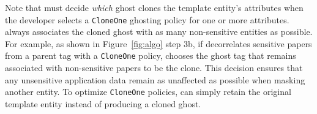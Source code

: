 Note that \sys must decide \emph{which} ghost clones the template entity's attributes when the
developer selects a \texttt{CloneOne} ghosting policy for one or more attributes. \sys always
associates the cloned ghost with as many non-sensitive entities as possible. For example, as shown
in Figure~\ref{fig:algo} step 3b, if \sys decorrelates sensitive papers from a parent tag with a
\texttt{CloneOne} policy, \sys chooses the ghost tag that remains associated with non-sensitive
papers to be the clone. This decision ensures that any unsensitive application
data remain as unaffected as possible when masking another entity.
To optimize
\texttt{CloneOne} policies, \sys can simply retain the original template entity instead of producing
a cloned ghost.
\fi



